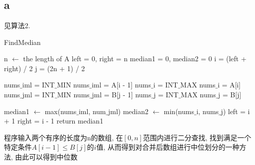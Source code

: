 \documentclass{article}
\begin{document}
\section{}
\subsection{a}
见算法2. 

\begin{algorithm}
\caption{FindMedian}
\begin{algorithmic}[1]
\State n $\gets$ the length of A
\State left = 0, right = n
\State median1 = 0, median2 = 0
\State i = (left + right) / 2
\State j = (2n + 1) / 2 

\State nums$\_$iml = INT$\_$MIN
\Else
\State nums$\_$iml = A[i - 1]
\EndIf
{}
\State nums$\_$i = INT$\_$MAX
\Else
\State nums$\_$i = A[i]
\EndIf
{}
\State nums$\_$jml = INT$\_$MIN
\Else
\State nums$\_$jml = B[j - 1]
\EndIf
{}
\State nums$\_$j = INT$\_$MAX
\Else
\State nums$\_$j = B[j]
\EndIf

\State median1 $\gets$ max(nums$\_$iml, num$\_$jml)
\State median2 $\gets$ min(nums$\_$i, nums$\_$j)
\State left = i + 1
\Else
\State right = i - 1
\EndIf
\EndWhile
\State return median1
\EndProcedure

\end{algorithmic}
\end{algorithm}
程序输入两个有序的长度为n的数组, 在$[0,n]$范围内进行二分查找, 找到满足一个特定条件$A[i-1] \leq B[j]$的$i$值, 从而得到对合并后数组进行中位划分的一种方法, 由此可以得到中位数
\end{document}
